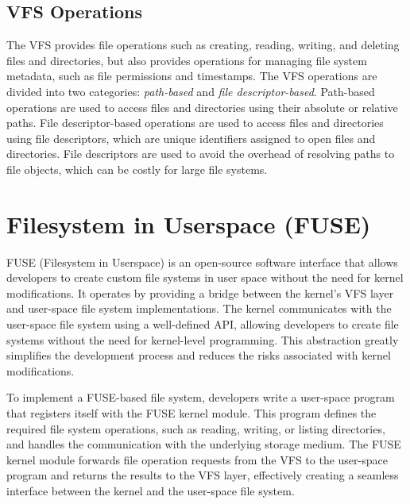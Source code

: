 \subsection{VFS Operations}\label{subsec:vfs-operations}

The VFS provides file operations such as creating, reading, writing, and deleting files and directories, but also provides operations for managing file system metadata, such as file permissions and timestamps.
The VFS operations are divided into two categories: \textit{path-based} and \textit{file descriptor-based}.
Path-based operations are used to access files and directories using their absolute or relative paths.
File descriptor-based operations are used to access files and directories using file descriptors, which are unique identifiers assigned to open files and directories.
File descriptors are used to avoid the overhead of resolving paths to file objects, which can be costly for large file systems.

\section{Filesystem in Userspace (FUSE)}\label{sec:filesystem-in-userspace-(fuse)}

FUSE (Filesystem in Userspace) is an open-source software interface that allows developers to create custom file systems in user space without the need for kernel modifications.
It operates by providing a bridge between the kernel's VFS layer and user-space file system implementations.
The kernel communicates with the user-space file system using a well-defined API, allowing developers to create file systems without the need for kernel-level programming.
This abstraction greatly simplifies the development process and reduces the risks associated with kernel modifications.

To implement a FUSE-based file system, developers write a user-space program that registers itself with the FUSE kernel module.
This program defines the required file system operations, such as reading, writing, or listing directories, and handles the communication with the underlying storage medium.
The FUSE kernel module forwards file operation requests from the VFS to the user-space program and returns the results to the VFS layer, effectively creating a seamless interface between the kernel and the user-space file system.

